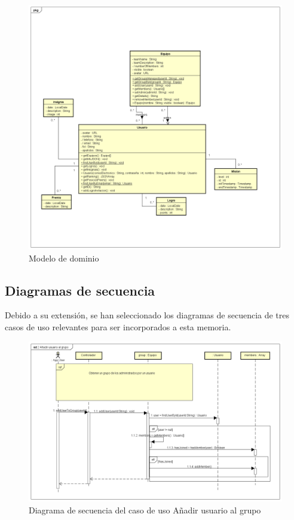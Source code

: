 \documentclass[twoside]{report}
\begin{document}
\begin{figure}[H]
\begin{center}
\includegraphics[scale=0.4]{images/clases.png}
\caption{Modelo de dominio}
\end{center}
\end{figure}

\subsection{Diagramas de secuencia}

Debido a su extensión, se han seleccionado los diagramas de secuencia de tres casos de uso relevantes para ser incorporados a esta memoria.

\begin{figure}[H]
\includegraphics[scale=0.5]{images/sequenceAddUserToGroup}
\caption{Diagrama de secuencia del caso de uso A\~{n}adir usuario al grupo}
\end{figure}
\end{document}

